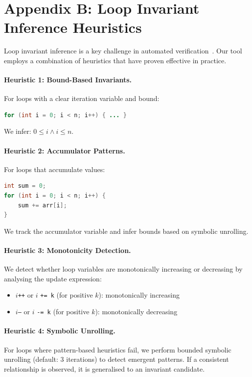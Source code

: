 \documentclass[11pt]{article}
\begin{document}
\section{Appendix B: Loop Invariant Inference Heuristics}
\label{app:loop-heuristics}

Loop invariant inference is a key challenge in automated verification~\cite{cousot2011contract, wei2011inferring}. Our tool employs a combination of heuristics that have proven effective in practice.

\paragraph{Heuristic 1: Bound-Based Invariants.}
For loops with a clear iteration variable and bound:
\begin{lstlisting}[language=Java]
for (int i = 0; i < n; i++) { ... }
\end{lstlisting}
We infer: $0 \leq i \land i \leq n$.

\paragraph{Heuristic 2: Accumulator Patterns.}
For loops that accumulate values:
\begin{lstlisting}[language=Java]
int sum = 0;
for (int i = 0; i < n; i++) {
    sum += arr[i];
}
\end{lstlisting}
We track the accumulator variable and infer bounds based on symbolic unrolling.

\paragraph{Heuristic 3: Monotonicity Detection.}
We detect whether loop variables are monotonically increasing or decreasing by analysing the update expression:
\begin{itemize}
    \item $i$\texttt{++} or $i$ \texttt{+= k} (for positive $k$): monotonically increasing
    \item $i$\texttt{--} or $i$ \texttt{-= k} (for positive $k$): monotonically decreasing
\end{itemize}

\paragraph{Heuristic 4: Symbolic Unrolling.}
For loops where pattern-based heuristics fail, we perform bounded symbolic unrolling (default: 3 iterations) to detect emergent patterns. If a consistent relationship is observed, it is generalised to an invariant candidate.
\end{document}
